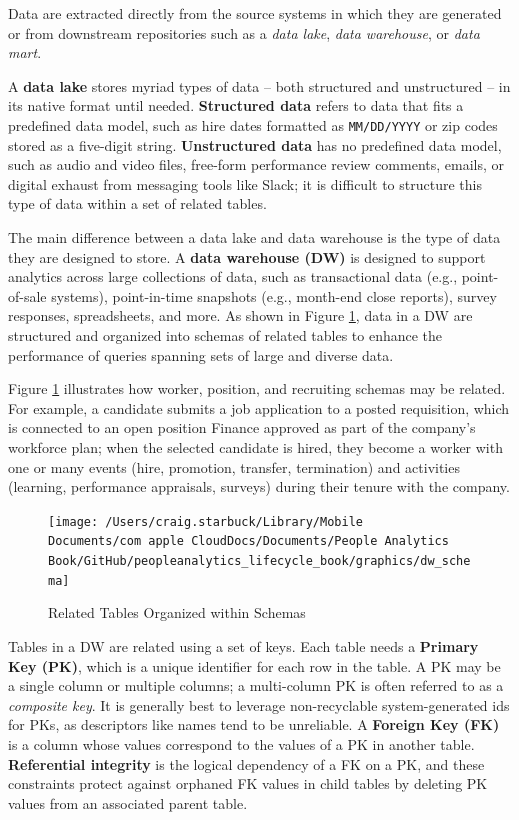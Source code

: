 \documentclass[]{book}
\begin{document}
Data are extracted directly from the source systems in which they are generated or from downstream repositories such as a \emph{data lake}, \emph{data warehouse}, or \emph{data mart}.

A \textbf{data lake} stores myriad types of data -- both structured and unstructured -- in its native format until needed. \textbf{Structured data} refers to data that fits a predefined data model, such as hire dates formatted as \texttt{MM/DD/YYYY} or zip codes stored as a five-digit string. \textbf{Unstructured data} has no predefined data model, such as audio and video files, free-form performance review comments, emails, or digital exhaust from messaging tools like Slack; it is difficult to structure this type of data within a set of related tables.

The main difference between a data lake and data warehouse is the type of data they are designed to store. A \textbf{data warehouse (DW)} is designed to support analytics across large collections of data, such as transactional data (e.g., point-of-sale systems), point-in-time snapshots (e.g., month-end close reports), survey responses, spreadsheets, and more. As shown in Figure \ref{fig:dw-schema}, data in a DW are structured and organized into schemas of related tables to enhance the performance of queries spanning sets of large and diverse data.

Figure \ref{fig:dw-schema} illustrates how worker, position, and recruiting schemas may be related. For example, a candidate submits a job application to a posted requisition, which is connected to an open position Finance approved as part of the company's workforce plan; when the selected candidate is hired, they become a worker with one or many events (hire, promotion, transfer, termination) and activities (learning, performance appraisals, surveys) during their tenure with the company.

\begin{figure}

{\centering \texttt{[image: /Users/craig.starbuck/Library/Mobile Documents/com~apple~CloudDocs/Documents/People Analytics Book/GitHub/peopleanalytics\_lifecycle\_book/graphics/dw\_schema]} 

}

\caption{Related Tables Organized within Schemas}\label{fig:dw-schema}
\end{figure}

Tables in a DW are related using a set of keys. Each table needs a \textbf{Primary Key (PK)}, which is a unique identifier for each row in the table. A PK may be a single column or multiple columns; a multi-column PK is often referred to as a \emph{composite key}. It is generally best to leverage non-recyclable system-generated ids for PKs, as descriptors like names tend to be unreliable. A \textbf{Foreign Key (FK)} is a column whose values correspond to the values of a PK in another table. \textbf{Referential integrity} is the logical dependency of a FK on a PK, and these constraints protect against orphaned FK values in child tables by deleting PK values from an associated parent table.
\end{document}
